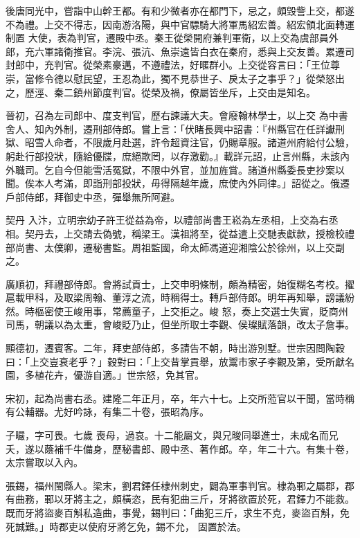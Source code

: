 \begin{pinyinscope}
 後唐同光中，嘗詣中山幹王都。有和少微者亦在都門下，忌之，頗毀訾上交，都遂不為禮。上交不得志，因南游洛陽，與中官驃騎大將軍馬紹宏善。紹宏領北面轉運制置
 大使，表為判官，遷殿中丞。秦王從榮開府兼判軍衛，以上交為虞部員外郎，充六軍諸衛推官。李浣、張沆、魚崇遠皆白衣在秦府，悉與上交友善。累遷司封郎中，充判官。從榮素豪邁，不遵禮法，好暱群小。上交從容言曰：「王位尊崇，當修令德以慰民望，王忍為此，獨不見恭世子、戾太子之事乎？」從榮怒出之，歷涇、秦二鎮州節度判官。從榮及禍，僚屬皆坐斥，上交由是知名。



 晉初，召為左司郎中、度支判官，歷右諫議大夫。會廢翰林學士，以上交
 為中書舍人、知內外制，遷刑部侍郎。嘗上言：「伏睹長興中詔書：『州縣官在任詳讞刑獄、昭雪人命者，不限歲月赴選，許令超資注官，仍賜章服。諸道州府給付公驗，躬赴行部投狀，隨給優牒，庶絕欺罔，以存激勸。』載詳元詔，止言州縣，未該內外職司。乞自今但能雪活冤獄，不限中外官，並加旌賞。諸道州縣委長吏抄案以聞。俟本人考滿，即詣刑部投狀，毋得隔越年歲，庶使內外同律。」詔從之。俄遷戶部侍郎，拜御史中丞，彈舉無所阿避。



 契丹
 入汴，立明宗幼子許王從益為帝，以禮部尚書王崧為左丞相，上交為右丞相。契丹去，上交請去偽號，稱梁王。漢祖將至，從益遣上交馳表獻款，授檢校禮部尚書、太僕卿，遷秘書監。周祖監國，命太師馮道迎湘陰公於徐州，以上交副之。



 廣順初，拜禮部侍郎。會將試貢士，上交申明條制，頗為精密，始復糊名考校。擢扈載甲科，及取梁周翰、董淳之流，時稱得士。轉戶部侍郎。明年再知舉，謗議紛然。時樞密使王峻用事，常薦童子，上交拒之。峻
 怒，奏上交選士失實，貶商州司馬，朝議以為太重，會峻貶乃止，但坐所取士李觀、侯璨賦落韻，改太子詹事。



 顯德初，遷賓客。二年，拜吏部侍郎，多請告不朝，時出游別墅。世宗因問陶穀曰：「上交豈衰老乎？」穀對曰：「上交昔掌貢舉，放鬻市家子李觀及第，受所獻名園，多植花卉，優游自適。」世宗怒，免其官。



 宋初，起為尚書右丞。建隆二年正月，卒，年六十七。上交所蒞官以干聞，當時稱有公輔器。尤好吟詠，有集二十卷，張昭為序。



 子曮，字可畏。七歲
 喪母，過哀。十二能屬文，與兄晙同舉進士，未成名而兄夭，遂以蔭補千牛備身，歷秘書郎、殿中丞、著作郎。卒，年二十六。有集十卷，太宗嘗取以入內。



 張錫，福州閩縣人。梁末，劉君鐸任棣州刺史，闢為軍事判官。棣為鄆之屬郡，郡有曲務，鄆以牙將主之，頗橫恣，民有犯曲三斤，牙將欲置於死，君鐸力不能救。既而牙將盜麥百斛私造曲，事覺，錫判曰：「曲犯三斤，求生不克，麥盜百斛，免死誠難。」時郡吏以使府牙將乞免，錫不允，
 固置於法。




\end{pinyinscope}
